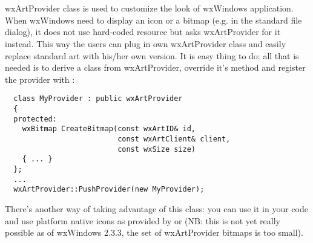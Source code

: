 %
%

\section{}\label{wxartprovider}

wxArtProvider class is used to customize the look of wxWindows application.
When wxWindows need to display an icon or a bitmap (e.g. in the standard file
dialog), it does not use hard-coded resource but asks wxArtProvider for it
instead. This way the users can plug in own wxArtProvider class and easily
replace standard art with his/her own version. It is easy thing to do: all
that is needed is to derive a class from wxArtProvider, override it's
 method and register the
provider with
:

\begin{verbatim}
  class MyProvider : public wxArtProvider
  {
  protected:
    wxBitmap CreateBitmap(const wxArtID& id, 
                          const wxArtClient& client,
                          const wxSize size)
    { ... }
  };
  ...
  wxArtProvider::PushProvider(new MyProvider);
\end{verbatim}

There's another way of taking advantage of this class: you can use it in your code and use
platform native icons as provided by
 or 
 (NB: this is not yet really
possible as of wxWindows 2.3.3, the set of wxArtProvider bitmaps is too
small). 


